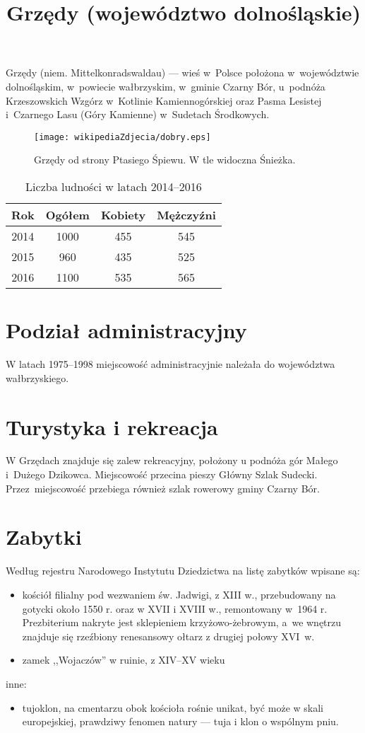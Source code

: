 \documentclass[a4paper,12pt]{article}
\title{Grzędy (województwo dolnośląskie)}
\author{}
\begin{document}
\maketitle
Grzędy (niem. Mittelkonradswaldau) --- wieś w~Polsce położona w~województwie dolnośląskim, w~powiecie wałbrzyskim, w~gminie Czarny Bór, u~podnóża Krzeszowskich Wzgórz w~Kotlinie Kamiennogórskiej oraz Pasma Lesistej i~Czarnego Lasu (Góry Kamienne) w~Sudetach Środkowych.
\begin{figure}
\begin{center}
\texttt{[image: wikipediaZdjecia/dobry.eps]}
\caption{Grzędy od strony Ptasiego Śpiewu. W tle widoczna Śnieżka.}
\end{center}
\end{figure}

\begin{table}
\begin{tabular}{cccc}
\hline
\textbf{Rok}&\textbf{Ogółem}&\textbf{Kobiety}&\textbf{Mężczyźni}\\
\hline
2014&1000&455&545\\
2015&960&435&525\\
2016&1100&535&565\\
\end{tabular}
\caption{Liczba ludności w latach 2014--2016}
\end{table}


\tableofcontents

\section{Podział administracyjny}
W latach 1975--1998 miejscowość administracyjnie należała do województwa wałbrzyskiego.
\section{Turystyka i rekreacja}
W Grzędach znajduje się zalew rekreacyjny, położony u podnóża gór Małego i~Dużego Dzikowca. Miejscowość przecina pieszy Główny Szlak Sudecki. Przez~miejscowość przebiega również szlak rowerowy gminy Czarny Bór.
\section{Zabytki}
Według rejestru Narodowego Instytutu Dziedzictwa na listę zabytków wpisane są:
\begin{itemize}
\item kościół filialny pod wezwaniem św. Jadwigi, z XIII w., przebudowany na gotycki około 1550 r. oraz w XVII i XVIII w., remontowany w~1964 r. 
Prezbiterium nakryte jest sklepieniem krzyżowo-żebrowym, a~we wnętrzu znajduje się rzeźbiony renesansowy ołtarz z drugiej połowy XVI~w.
\item zamek ,,Wojaczów'' w ruinie, z XIV--XV wieku
\end{itemize}
inne:
\begin{itemize}
\item tujoklon, na cmentarzu obok kościoła rośnie unikat, być może w skali europejskiej, prawdziwy fenomen natury --- tuja i klon o wspólnym pniu.
\end{itemize}
\end{document}
